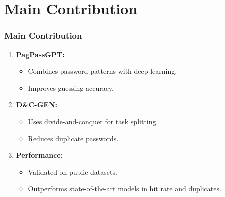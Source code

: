 \documentclass[
	12pt, %
]{beamer}
\begin{document}
\section{Main Contribution}
\begin{frame}
	\frametitle{Main Contribution}
	
	\begin{enumerate}
		\item \textbf{PagPassGPT:} 
		\begin{itemize}
			\item Combines password patterns with deep learning.
			\item Improves guessing accuracy.
		\end{itemize}
		
		\item \textbf{D\&C-GEN:}
		\begin{itemize}
			\item Uses divide-and-conquer for task splitting.
			\item Reduces duplicate passwords.
		\end{itemize}
		
		\item \textbf{Performance:}
		\begin{itemize}
			\item Validated on public datasets.
			\item Outperforms state-of-the-art models in hit rate and duplicates.
		\end{itemize}
	\end{enumerate}
\end{frame}
\end{document}

